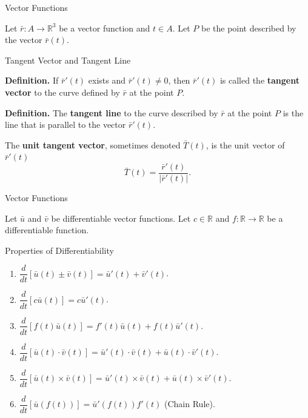 \documentclass{beamer}
\begin{document}
    \begin{frame}[t]{Vector Functions}
        \par Let $\bar{r}: A \to \mathbb{R}^3$ be a vector function and $t \in A$. Let $P$ be the point described by the vector $\bar{r}(t)$.
        \begin{block}{Tangent Vector and Tangent Line}
            \par \textbf{Definition.} If $\bar{r}'(t)$ exists and $\bar{r}'(t) \neq 0$, then $\bar{r}'(t)$ is called the \textbf{tangent vector} to the curve defined by $\bar{r}$ at the point $P$.

            \phantom{zjy}
            
            \par \textbf{Definition.} The \textbf{tangent line} to the curve described by $\bar{r}$ at the point $P$ is the line that is parallel to the vector $\bar{r}'(t)$.
        \end{block}

        \par The \textbf{unit tangent vector}, sometimes denoted $\bar{T}(t)$, is the unit vector of $\bar{r}'(t)$
        \begin{equation*}
            \bar{T} (t) = \dfrac{\bar{r}'(t)}{|\bar{r}'(t)|} .
        \end{equation*}
    \end{frame}

    \begin{frame}[t]{Vector Functions}
        \par Let $\bar{u}$ and $\bar{v}$ be differentiable vector functions. Let $c \in \mathbb{R}$ and $f: \mathbb{R} \to \mathbb{R}$ be a differentiable function.
        \begin{block}{Properties of Differentiability}
            \begin{enumerate}
                \item $\dfrac{d}{dt} [\bar{u} (t) \pm \bar{v} (t)] = \bar{u}'(t) + \bar{v}'(t)$.
                \item $\dfrac{d}{dt} [c \bar{u}(t)] = c \bar{u}'(t)$.
                \item $\dfrac{d}{dt} [ f(t) \bar{u} (t)] = f'(t) \bar{u}(t) + f(t) \bar{u}'(t)$.
                \item $\dfrac{d}{dt} [\bar{u} (t) \cdot \bar{v} (t)] = \bar{u}'(t) \cdot \bar{v}(t) + \bar{u} (t) \cdot \bar{v}'(t)$.
                \item $\dfrac{d}{dt} [\bar{u} (t) \times \bar{v} (t)] = \bar{u}'(t) \times \bar{v}(t) + \bar{u} (t) \times \bar{v}'(t)$.
                \item $\dfrac{d}{dt} [\bar{u} (f(t))] = \bar{u}'(f(t)) f'(t)$ (Chain Rule).
            \end{enumerate}
        \end{block}
    \end{frame}
\end{document}
